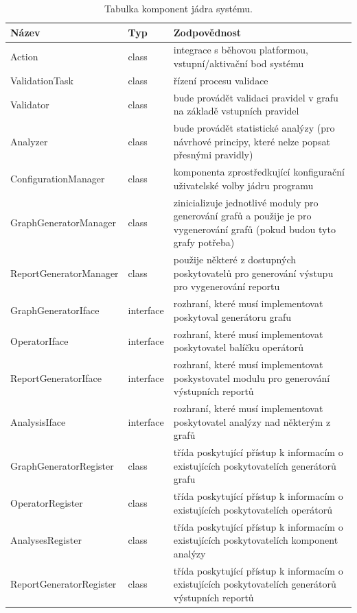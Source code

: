 \begin{table}
  \caption{Tabulka komponent jádra systému. \label{design-archval_core_components}}
  \begin{center}
    \begin{tabular}{| l | l | p{8cm} | }
      \hline
      \textbf{Název} & \textbf{Typ} & \textbf{Zodpovědnost} \\
      \hline
      \hline
      Action & class & integrace s běhovou platformou, vstupní/aktivační bod systému \\ \hline
      ValidationTask & class & řízení procesu validace \\ \hline
      Validator & class & bude provádět validaci pravidel v grafu na základě vstupních pravidel \\ \hline
      Analyzer & class & bude provádět statistické analýzy (pro návrhové principy, které nelze popsat přesnými pravidly) \\ \hline
      ConfigurationManager & class & komponenta zprostředkující konfigurační uživatelské volby jádru programu \\ \hline
      GraphGeneratorManager & class & zinicializuje jednotlivé moduly pro generování grafů a použije je pro vygenerování grafů (pokud budou tyto grafy potřeba) \\ \hline
      ReportGeneratorManager & class & použije některé z dostupných poskytovatelů pro generování výstupu pro vygenerování reportu \\ \hline
      GraphGeneratorIface & interface & rozhraní, které musí implementovat poskytoval generátoru grafu \\ \hline
      OperatorIface & interface & rozhraní, které musí implementovat poskytovatel balíčku operátorů \\ \hline
      ReportGeneratorIface & interface & rozhraní, které musí implementovat poskystovatel modulu pro generování výstupních reportů \\ \hline
      AnalysisIface & interface & rozhraní, které musí implementovat poskytovatel analýzy nad některým z grafů \\ \hline
      GraphGeneratorRegister & class & třída poskytující přístup k informacím o existujících poskytovatelích generátorů grafu \\ \hline
      OperatorRegister & class & třída poskytující přístup k informacím o existujících poskytovatelích operátorů \\ \hline
      AnalysesRegister & class & třída poskytující přístup k informacím o existujících poskytovatelích komponent analýzy \\ \hline
      ReportGeneratorRegister & class & třída poskytující přístup k informacím o existujících poskytovatelích generátorů výstupních reportů \\ \hline
    \end{tabular}
  \end{center}

\end{table}

